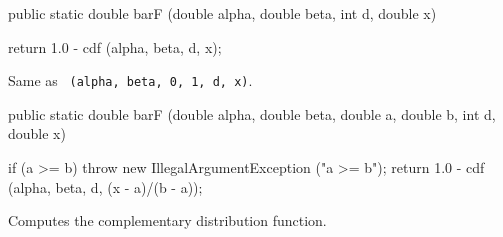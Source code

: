 \begin{code}

   public static double barF (double alpha, double beta, int d, double x)\begin{hide} {
      return 1.0 - cdf (alpha, beta, d, x);
   }\end{hide}
\end{code}
\begin{tabb}  Same as
 ~\texttt{(alpha, beta, 0, 1, d, x)}.
\end{tabb}
\begin{code}

   public static double barF (double alpha, double beta,
                              double a, double b, int d, double x)\begin{hide} {
      if (a >= b)
         throw new IllegalArgumentException ("a >= b");
      return 1.0 - cdf (alpha, beta, d, (x - a)/(b - a));
   }\end{hide}
\end{code}
  \begin{tabb}
  Computes the complementary distribution function.
 \end{tabb}
